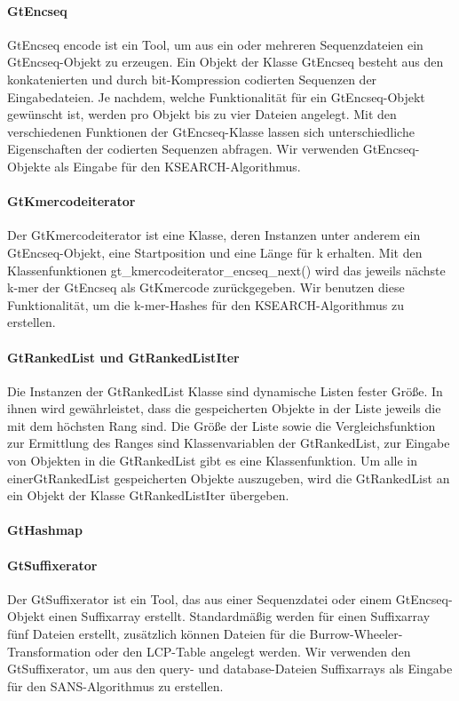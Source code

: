 \documentclass{article}
\begin{document}
\paragraph{GtEncseq}
GtEncseq encode ist ein Tool, um aus ein oder mehreren Sequenzdateien ein GtEncseq-Objekt zu erzeugen. Ein Objekt der Klasse GtEncseq besteht aus den konkatenierten und durch bit-Kompression codierten Sequenzen der Eingabedateien. Je nachdem, welche Funktionalität für ein GtEncseq-Objekt gewünscht ist, werden pro Objekt bis zu vier Dateien angelegt. Mit den verschiedenen Funktionen der GtEncseq-Klasse lassen sich unterschiedliche Eigenschaften der codierten Sequenzen abfragen. Wir verwenden GtEncseq-Objekte als Eingabe für den KSEARCH-Algorithmus.

\paragraph{GtKmercodeiterator}
Der GtKmercodeiterator ist eine Klasse, deren Instanzen unter anderem ein GtEncseq-Objekt, eine Startposition und eine Länge für k erhalten. Mit den Klassenfunktionen gt\_kmercodeiterator\_encseq\_next() wird das jeweils nächste k-mer der GtEncseq als GtKmercode zurückgegeben. Wir benutzen diese Funktionalität, um die k-mer-Hashes für den KSEARCH-Algorithmus zu erstellen.

\paragraph{GtRankedList und GtRankedListIter}
Die Instanzen der GtRankedList Klasse sind dynamische Listen fester Größe. In ihnen wird gewährleistet, dass die gespeicherten Objekte in der Liste jeweils die mit dem höchsten Rang sind. Die Größe der Liste sowie die Vergleichsfunktion zur Ermittlung des Ranges sind Klassenvariablen der GtRankedList, zur Eingabe von Objekten in die GtRankedList gibt es eine Klassenfunktion. Um alle in einerGtRankedList gespeicherten Objekte auszugeben, wird die GtRankedList an ein Objekt der Klasse GtRankedListIter übergeben.

\paragraph{GtHashmap}


\paragraph{GtSuffixerator}
Der GtSuffixerator ist ein Tool, das aus einer Sequenzdatei oder einem GtEncseq-Objekt einen Suffixarray erstellt. Standardmäßig werden für einen Suffixarray fünf Dateien erstellt, zusätzlich können Dateien für die Burrow-Wheeler-Transformation oder den LCP-Table angelegt werden. Wir verwenden den GtSuffixerator, um aus den query- und database-Dateien Suffixarrays als Eingabe für den SANS-Algorithmus zu erstellen.
\end{document}
